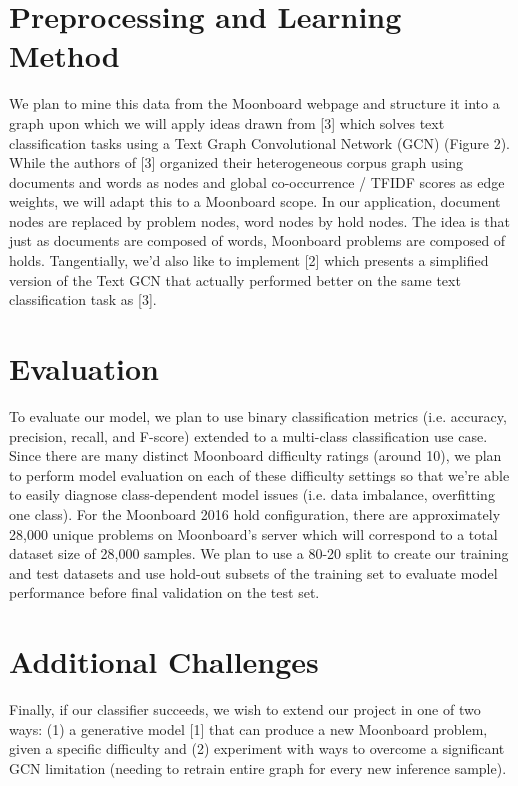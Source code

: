 \documentclass{article}
\begin{document}
\section{Preprocessing and Learning Method}
We plan to mine this data from the Moonboard webpage and structure it into a graph upon which we will apply ideas drawn from [3] which solves text classification tasks using a Text Graph Convolutional Network (GCN) (Figure 2). While the authors of [3] organized their heterogeneous corpus graph using documents and words as nodes and global co-occurrence / TFIDF scores as edge weights, we will adapt this to a Moonboard scope. In our application, document nodes are replaced by problem nodes, word nodes by hold nodes. The idea is that just as documents are composed of words, Moonboard problems are composed of holds. Tangentially, we'd also like to implement  [2] which presents a simplified version of the Text GCN that actually performed better on the same text classification task as [3]. 

\section{Evaluation}
To evaluate our model, we plan to use binary classification metrics (i.e. accuracy, precision, recall, and F-score) extended to a multi-class classification use case. Since there are many distinct Moonboard difficulty ratings (around 10), we plan to perform model evaluation on each of these difficulty settings so that we're able to easily diagnose class-dependent model issues (i.e. data imbalance, overfitting one class). For the Moonboard 2016 hold configuration, there are approximately 28,000 unique problems on Moonboard's server which will correspond to a total dataset size of 28,000 samples. We plan to use a 80-20 split to create our training and test datasets and use hold-out subsets of the training set to evaluate model performance before final validation on the test set. 

\section{Additional Challenges}
Finally, if our classifier succeeds, we wish to extend our project in one of two ways: (1) a generative model [1] that can produce a new Moonboard problem, given a specific difficulty and (2) experiment with ways to overcome a significant GCN limitation (needing to retrain entire graph for every new inference sample).
\end{document}
